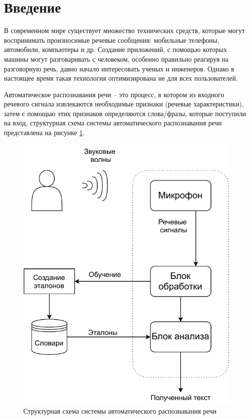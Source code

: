 \chapter*{Введение}

В современном мире существует множество технических средств, которые могут воспринимать произносимые речевые сообщения: мобильные телефоны, автомобили, компьютеры и др. Создание приложений, с помощью которых машины могут разговаривать с человеком, особенно правильно реагируя на разговорную речь, давно начало интересовать ученых и инженеров. Однако в настоящее время такая технология оптимизирована не для всех пользователей.

Автоматическое распознавания речи -- это процесс, в котором из входного речевого сигнала извлекаются необходимые признаки (речевые характеристики), затем с помощью этих признаков определяются слова/фразы, которые поступили на вход, структурная схема системы автоматического распознавания речи представлена на рисунке \ref{fig:shema}. \cite{vvegenie} \cite{vvegenie2}


\begin{figure}[h!]
	\begin{center}
	\includegraphics[pages=-, scale=0.9]{./inc/img/3.pdf}
	\caption{Структурная схема системы автоматического распознавания речи}  
	\label{fig:shema}
\end{center}
\end{figure}


